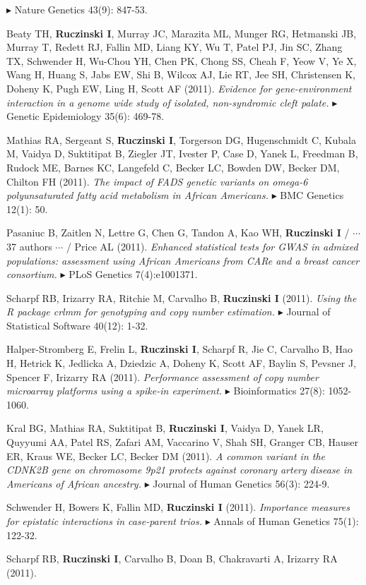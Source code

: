 \documentclass[10pt]{article}
\newcommand{\mine}{
  \addtocounter{enumi}{1}
\item[\fcolorbox{white}{grey}{\color{white} \tiny \arabic{enumi}}]
}
\newcommand{\dg}[1]{{\color{black} $\blacktriangleright$ {#1}}}
\begin{document}
\dg{Nature Genetics} 43(9): 847-53.
\item 
Beaty TH, {\bf Ruczinski I}, Murray JC, Marazita ML, Munger RG, Hetmanski JB, Murray T, Redett RJ, Fallin MD, Liang KY, Wu T, Patel PJ, Jin SC, Zhang TX, Schwender H, Wu-Chou YH, Chen PK, Chong SS, Cheah F, Yeow V, Ye X, Wang H, Huang S, Jabs EW, Shi B, Wilcox AJ, Lie RT, Jee SH, Christensen K, Doheny K, Pugh EW, Ling H, Scott AF (2011).
{\it Evidence for gene-environment interaction in a genome wide study of isolated, non-syndromic cleft palate.}
\dg{Genetic Epidemiology} 35(6): 469-78.
\item
Mathias RA, Sergeant S, {\bf Ruczinski I}, Torgerson DG, Hugenschmidt C, Kubala M, Vaidya D, Suktitipat B, Ziegler JT, Ivester P, Case D, Yanek L, Freedman B, Rudock ME, Barnes KC, Langefeld C, Becker LC, Bowden DW, Becker DM, Chilton FH (2011).
{\it The impact of FADS genetic variants on omega-6 polyunsaturated fatty acid metabolism in African Americans.}
\dg{BMC Genetics} 12(1): 50.
\item 
Pasaniuc B, Zaitlen N, Lettre G, Chen G, Tandon A, Kao WH, {\bf Ruczinski I} / $\cdots$ 37 authors $\cdots$ / Price AL (2011).
{\it Enhanced statistical tests for GWAS in admixed populations: assessment using African Americans from CARe and a breast cancer consortium.}
\dg{PLoS Genetics} 7(4):e1001371.
\mine
Scharpf RB, Irizarry RA, Ritchie M, Carvalho B, {\bf Ruczinski I} (2011). 
{\it Using the R package crlmm for genotyping and copy number estimation.}
\dg{Journal of Statistical Software} 40(12): 1-32. 
\item 
Halper-Stromberg E, Frelin L, {\bf Ruczinski I}, Scharpf R, Jie C, Carvalho B, Hao H, Hetrick K, Jedlicka A, Dziedzic A, Doheny K, Scott AF, Baylin S, Pevsner J, Spencer F, Irizarry RA (2011). 
{\it Performance assessment of copy number microarray platforms using a spike-in experiment.} 
\dg{Bioinformatics} 27(8): 1052-1060.
\item 
Kral BG, Mathias RA, Suktitipat B, {\bf Ruczinski I}, Vaidya D, Yanek LR, Quyyumi AA, Patel RS, Zafari AM, Vaccarino V, Shah SH, Granger CB, Hauser ER, Kraus WE, Becker LC, Becker DM (2011).
{\it A common variant in the CDNK2B gene on chromosome 9p21 protects against coronary artery disease in Americans of African ancestry.}
\dg{Journal of Human Genetics} 56(3): 224-9. 
\mine
Schwender H, Bowers K, Fallin MD, {\bf Ruczinski I} (2011). 
{\it Importance measures for epistatic interactions in case-parent trios.}
\dg{Annals of Human Genetics} 75(1): 122-32. 
\item
Scharpf RB, {\bf Ruczinski I}, Carvalho B, Doan B, Chakravarti A, Irizarry RA (2011).
\end{document}
